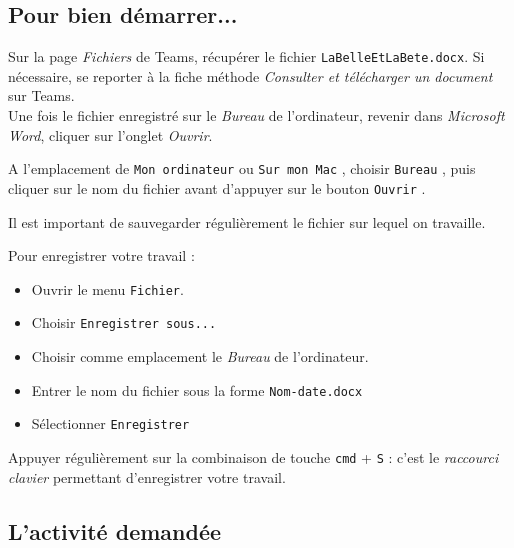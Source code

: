 \subsection{Pour bien démarrer...}

Sur la page \emph{Fichiers} de Teams, récupérer le fichier \texttt{LaBelleEtLaBete.docx}. Si nécessaire, se reporter à la fiche méthode \emph{Consulter et télécharger un document} sur Teams.\\

Une fois le fichier enregistré sur le \emph{Bureau} de l'ordinateur, revenir dans \emph{Microsoft Word}, cliquer sur l'onglet \emph{Ouvrir}.


A l'emplacement de \texttt{Mon ordinateur} ou \texttt{Sur mon Mac} , choisir \texttt{Bureau} , puis cliquer sur le nom du fichier  avant d'appuyer sur le bouton \texttt{Ouvrir} .      






Il est important de sauvegarder régulièrement le fichier sur lequel on travaille.

Pour enregistrer votre travail :
\begin{itemize}
\item Ouvrir le menu \texttt{Fichier}.
\item Choisir \texttt{Enregistrer sous...} 
\item Choisir comme emplacement le \emph{Bureau}  de l'ordinateur.
\item Entrer le nom du fichier sous la forme \texttt{Nom-date.docx}
\item Sélectionner \texttt{Enregistrer} 
\end{itemize}


Appuyer régulièrement sur la combinaison de touche \texttt{cmd} + \texttt{S} : c'est le \emph{raccourci clavier} permettant d'enregistrer votre travail.



\subsection{L'activité demandée}

